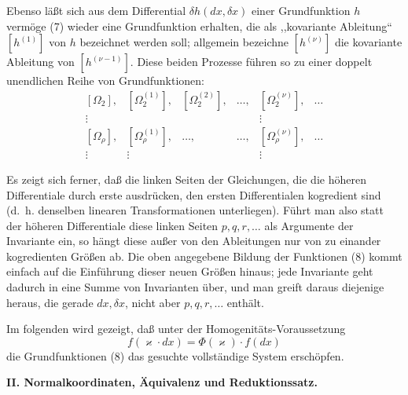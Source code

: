 Ebenso läßt sich aus dem Differential \(\delta h(dx,\delta x)\) einer
Grundfunktion \(h\) vermöge (7) wieder eine Grundfunktion erhalten, die
als ,,kovariante Ableitung`` \([h^{(1)}]\) von \(h\) bezeichnet werden
soll; allgemein bezeichne \([h^{(\nu)}]\) die kovariante Ableitung von
\([h^{(\nu-1)}]\). Diese beiden Prozesse führen so zu einer doppelt
unendlichen Reihe von Grundfunktionen:
\begin{equation}
\begin{array}{cccccc}
[\Omega_2], & [\Omega_2^{(1)}], & [\Omega_2^{(2)}], & \ldots,
& [\Omega_2^{(\nu)}], & \ldots\\
\vdots &&&& \vdots&\\
{}[\Omega_\rho], & [\Omega_\rho^{(1)}], & \ldots, & \ldots,
& [\Omega_\rho^{(\nu)}], & \ldots\\
\vdots & \vdots &&& \vdots&
\end{array}
\tag{8}
\end{equation}

Es zeigt sich ferner, daß die linken Seiten der Gleichungen, die die
höheren Differentiale durch erste ausdrücken, den ersten Differentialen
kogredient sind (d.~h. denselben linearen Transformationen unterliegen).
Führt man also statt der höheren Differentiale diese linken Seiten
\(p,q,r,\ldots\) als Argumente der Invariante ein, so hängt diese außer
von den Ableitungen nur von zu einander kogredienten Größen ab. Die
oben angegebene Bildung der Funktionen (8) kommt einfach auf die
Einführung dieser neuen Größen hinaus; jede Invariante geht dadurch in
eine Summe von Invarianten über, und man greift daraus diejenige heraus,
die gerade \(dx,\delta x\), nicht aber \(p,q,r,\ldots\) enthält.

Im folgenden wird gezeigt, daß unter der Homogenitäts-Voraussetzung
\[
f(\varkappa\cdot dx)=\Phi(\varkappa)\cdot f(dx)
\]
die Grundfunktionen (8) das gesuchte vollständige System erschöpfen.

\begin{center}
\textbf{II. Normalkoordinaten, Äquivalenz und Reduktionssatz.}
\end{center}


